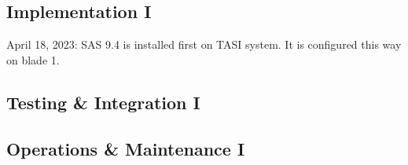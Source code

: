 \subsection{Implementation I}

April 18, 2023:
SAS 9.4 is installed first on TASI system. It is configured this way on blade 1. 


\subsection{Testing \& Integration I}


\subsection{Operations \& Maintenance I}